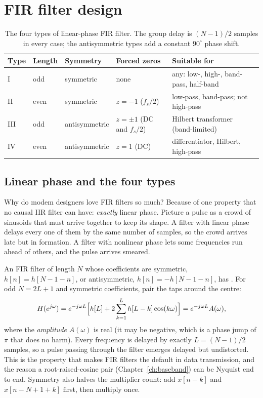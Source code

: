 \section{FIR filter design}
\label{sec:ch06:fir}

\begin{table}[htbp]\centering\small
\caption{The four types of linear-phase FIR filter. The group delay is $(N-1)/2$ samples in every
case; the antisymmetric types add a constant $90^\circ$ phase shift.}\label{tab:ch06:types}
\begin{tabular}{lllll}
\toprule
Type & Length & Symmetry & Forced zeros & Suitable for \\
\midrule
I & odd & symmetric & none & any: low-, high-, band-pass, half-band \\
II & even & symmetric & $z=-1$ ($f_s/2$) & low-pass, band-pass; not high-pass \\
III & odd & antisymmetric & $z=\pm1$ (DC and $f_s/2$) & Hilbert transformer (band-limited) \\
IV & even & antisymmetric & $z=1$ (DC) & differentiator, Hilbert, high-pass \\
\bottomrule
\end{tabular}
\end{table}

\subsection{Linear phase and the four types}

Why do modem designers love FIR filters so much? Because of one property that no causal IIR filter
can have: \emph{exactly} linear phase. Picture a pulse as a crowd of sinusoids that must arrive
together to keep its shape. A filter with linear phase delays every one of them by the same number
of samples, so the crowd arrives late but in formation. A filter with nonlinear phase lets some
frequencies run ahead of others, and the pulse arrives smeared.

An FIR filter of length $N$ whose coefficients are symmetric, $h[n]=h[N-1-n]$, or antisymmetric,
$h[n]=-h[N-1-n]$, has . For odd $N=2L+1$ and symmetric coefficients, pair the
taps around the centre:
\begin{equation}
H(e^{j\omega})=e^{-j\omega L}\Bigl[h[L]+2\sum_{k=1}^{L}h[L-k]\cos(k\omega)\Bigr]
=e^{-j\omega L}A(\omega),
\label{eq:ch06:linphase}
\end{equation}
where the \emph{amplitude} $A(\omega)$ is real (it may be negative, which is a phase jump of $\pi$
that does no harm). Every frequency is delayed by exactly $L=(N-1)/2$ samples, so a pulse passing
through the filter emerges delayed but undistorted. This is the property that makes FIR filters
the default in data transmission, and the reason a root-raised-cosine pair
(Chapter~\ref{ch:baseband}) can be Nyquist end to end. Symmetry also halves the multiplier count:
add $x[n-k]$ and $x[n-N+1+k]$ first, then multiply once.

